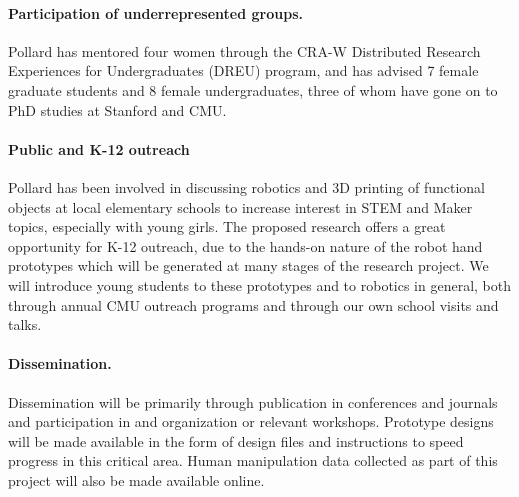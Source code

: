  \paragraph{Participation of underrepresented groups.}  Pollard has mentored four women through the CRA-W Distributed Research Experiences for Undergraduates (DREU) program, and has advised 7 female graduate students and 8 female undergraduates, three of whom have gone on to PhD studies at Stanford and CMU.

 \paragraph{Public and K-12 outreach}
Pollard has been involved in discussing robotics and 3D printing of functional objects at local elementary schools to increase interest in STEM and Maker topics, especially with young girls.  The proposed research offers a great opportunity for K-12 outreach, due to the hands-on nature of the robot hand prototypes which will be generated at many stages of the research project.   We will introduce young students to these prototypes and to robotics in general, both through annual CMU outreach programs and through our own school visits and talks.

 \paragraph{Dissemination.} 
 Dissemination will be primarily through publication in conferences and journals and participation in and organization or relevant workshops.    Prototype designs will be made available in the form of design files and instructions to speed progress in this critical area.   Human manipulation data collected as part of this project will also be made available online.

